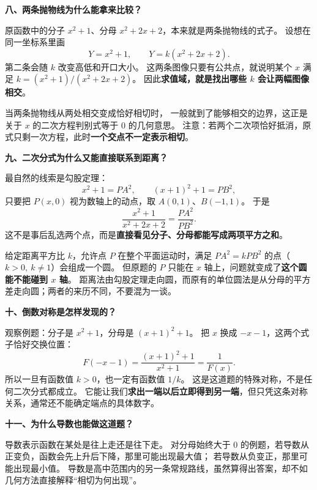 \clearpage
\begin{explanationbox}
\textbf{\textcolor{CExplanation}{八、两条抛物线为什么能拿来比较？}}

原函数中的分子 $x^2+1$、分母 $x^2+2x+2$，本来就是两条抛物线的式子。
设想在同一坐标系里画
\[
  Y=x^2+1,\qquad Y=k(x^2+2x+2).
\]
第二条会随 $k$ 改变高低和开口大小。
这两条图像只要有公共点，就说明某个 $x$ 满足
$k=(x^2+1)/(x^2+2x+2)$。
因此\textbf{求值域，就是找出哪些 $k$ 会让两幅图像相交}。

\begin{center}\end{center}

当两条抛物线从两处相交变成恰好相切时，
一般就到了能够相交的边界，这正是关于 $x$ 的二次方程判别式等于 $0$ 的几何意思。
注意：若两个二次项恰好抵消，原式只剩一次方程，此时\textbf{一个交点不一定表示相切}。

\medskip
\textbf{\textcolor{CExplanation}{九、二次分式为什么又能直接联系到距离？}}

最自然的线索是勾股定理：
\[
 x^2+1=PA^2,\qquad (x+1)^2+1=PB^2,
\]
只要把 $P(x,0)$ 视为数轴上的动点，取 $A(0,1)$、$B(-1,1)$。
于是
\[
  \boxed{\frac{x^2+1}{x^2+2x+2}=\frac{PA^2}{PB^2}.}
\]
这不是事后乱选两个点，而是\textbf{直接看见分子、分母都能写成两项平方之和}。

\begin{center}\end{center}

给定距离平方比 $k$，允许点 $P$ 在整个平面运动时，满足 $PA^2=kPB^2$ 的点（$k>0,\ k\ne1$）会组成一个圆。
但原题的 $P$ 只能在 $x$ 轴上，问题就变成了\textbf{这个圆能不能碰到 $x$ 轴}。
距离法由勾股定理走向圆，而原有的单位圆法是从分母的平方差走向圆；两者的来历不同，不要混为一谈。

\medskip
\textbf{\textcolor{CExplanation}{十、倒数对称是怎样发现的？}}

观察例题：分子是 $x^2+1$，分母是 $(x+1)^2+1$。
把 $x$ 换成 $-x-1$，这两个式子恰好交换位置：
\[
  F(-x-1)=\frac{(x+1)^2+1}{x^2+1}=\frac1{F(x)}.
\]
所以一旦有函数值 $k>0$，也一定有函数值 $1/k$。
这是这道题的特殊对称，不是任何二次分式都成立。
它能让我们\textbf{求出一端以后立即得到另一端}，但只凭这条对称关系，通常还不能确定端点的具体数字。

\medskip
\textbf{\textcolor{CExplanation}{十一、为什么导数也能做这道题？}}

导数表示函数在某处是往上走还是往下走。
对分母始终大于 $0$ 的例题，若导数从正变负，函数会先上升后下降，那里可能出现最大值；
若导数从负变正，那里可能出现最小值。
导数是高中范围内的另一条常规路线，虽然算得出答案，却不如几何方法直接解释“相切为何出现”。
\end{explanationbox}
